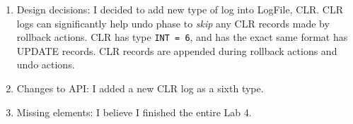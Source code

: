 \documentclass[10pt]{myland}
\begin{document}
\begin{enumerate}[label=\textbf{\arabic*.}, listparindent=0.0em, itemsep=2em]
    \item Design decisions:
        I decided to add new type of log into LogFile, CLR. CLR logs can significantly help undo phase to \emph{skip}
    any CLR records made by rollback actions. CLR has type \texttt{INT = 6}, and has the exact same format has UPDATE
    records. CLR records are appended during rollback actions and undo actions.

    \item Changes to API: I added a new CLR log as a sixth type.

    \item Missing elements: I believe I finished the entire Lab 4.

\end{enumerate}
\end{document}
